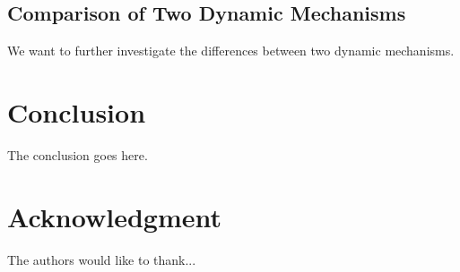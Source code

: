 \documentclass[conference]{IEEEtran}
\begin{document}

%
\subsection{Comparison of Two Dynamic Mechanisms}
We want to further investigate the differences between two dynamic mechanisms. 

\section{Conclusion}
The conclusion goes here.


\section*{Acknowledgment}


The authors would like to thank...\cite{IEEEhowto:kopka1}





\end{document}
